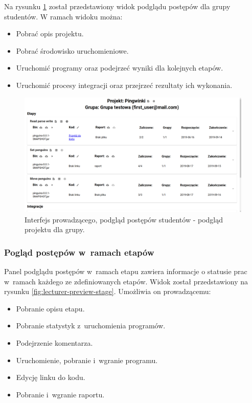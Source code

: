 Na rysunku \ref{fig:lecturer-interface-preview} został przedstawiony widok podglądu postępów dla grupy studentów.
W ramach widoku można:
\begin{itemize}
    \item Pobrać opis projektu.
    \item Pobrać środowisko uruchomieniowe.
    \item Uruchomić programy oraz podejrzeć wyniki dla kolejnych etapów.
    \item Uruchomić procesy integracji oraz przejrzeć rezultaty ich wykonania.
\end{itemize}

\vfill

\pagebreak

\begin{figure}[H]
    \centering
    \includegraphics[width = 16cm]{chapter04/lecturer_interface_preview.png}
    \caption{Interfejs prowadzącego, podgląd postępów studentów - podgląd projektu dla grupy.}
    \label{fig:lecturer-interface-preview}
\end{figure}


\subsubsection{Pogląd postępów w~ramach etapów}

Panel podglądu postępów w~ramach etapu zawiera informacje o statusie prac w~ramach każdego ze zdefiniowanych etapów.
Widok został przedstawiony na rysunku \ref{fig:lecturer-preview-stage}.
Umożliwia on prowadzącemu:
\begin {itemize}
    \item Pobranie opisu etapu.
    \item Pobranie statystyk z~uruchomienia programów.
    \item Podejrzenie komentarza.
    \item Uruchomienie, pobranie i~wgranie programu.
    \item Edycję linku do kodu.
    \item Pobranie i~wgranie raportu.
\end {itemize}


